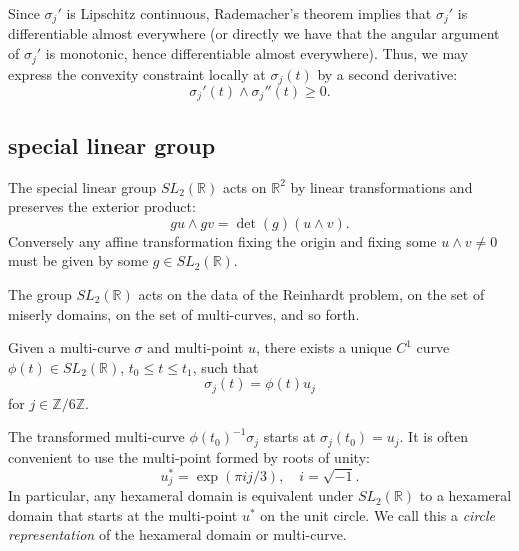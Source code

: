 \documentclass[11pt]{amsart}
\newcommand{\ring}[1]{\mathbb{#1}}
\begin{document}
Since $\sigma_j'$ is Lipschitz continuous, Rademacher's theorem
implies that $\sigma_j'$ is differentiable almost everywhere (or
directly we have that the angular argument of $\sigma_j'$ is monotonic, hence
differentiable almost everywhere).  Thus, we may express the convexity
constraint locally at $\sigma_j(t)$ by a second derivative:
$$
\sigma_j'(t)\land \sigma_j''(t) \ge 0.
$$



\subsection{special linear group}





The special linear group
$SL_2(\ring{R})$ acts on $\ring{R}^2$ by linear transformations and preserves the
exterior product:
\[
    {g u}\land{ g v}= \det(g)({u\land v}) .
\]
Conversely any affine transformation fixing the origin and fixing some
${u}\land{v}\ne 0$ must be given by some $g\in SL_2(\ring{R})$.

The group $SL_2(\ring{R})$ acts on the data of the Reinhardt problem, on the set of
miserly domains, on the set of multi-curves, and so forth.


Given a multi-curve $\sigma$ and multi-point $u$, there exists a
unique $C^1$ curve $\phi(t)\in SL_2(\ring{R})$, $t_0\le t \le t_1$,
such that
   \begin{equation}\label{eqn:sigma-phi}
   \sigma_j(t) = \phi(t) u_j
   \end{equation}
for $j\in \ring{Z}/6\ring{Z}$.

The transformed multi-curve $\phi(t_0)^{-1} \sigma_j$
starts at 
$\sigma_j(t_0) = u_j$.
It is often convenient to use the multi-point formed by roots of unity:
\begin{equation}\label{eqn:roots}
u^*_j = \exp(\pi i j/3),\quad { i = \sqrt{-1} }.
\end{equation}
In particular, any hexameral domain is equivalent under
$SL_2(\ring{R})$ to a hexameral domain that starts at the multi-point
$u^*$ on the unit circle.  We call this a {\it circle representation}
of the hexameral domain or multi-curve.


\end{document}
